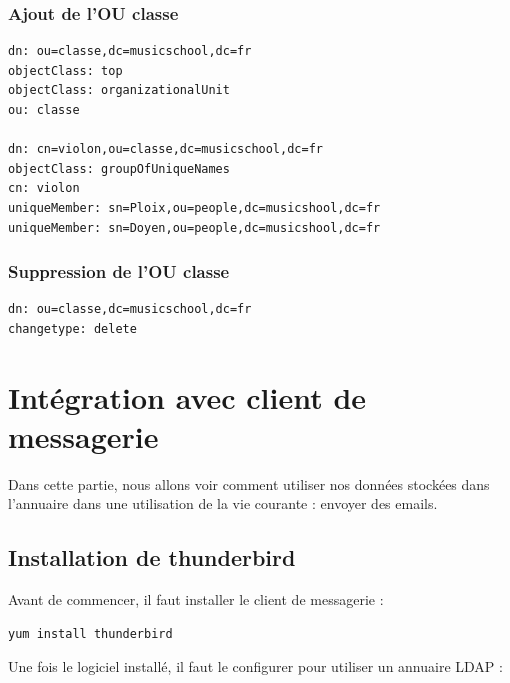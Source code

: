 \documentclass[12pt,a4paper,notitlepage]{article}
\begin{document}
\subsubsection{Ajout de l'OU classe}

\begin{lstlisting}[title=classe.ldif]
dn: ou=classe,dc=musicschool,dc=fr
objectClass: top
objectClass: organizationalUnit
ou: classe

dn: cn=violon,ou=classe,dc=musicschool,dc=fr
objectClass: groupOfUniqueNames
cn: violon
uniqueMember: sn=Ploix,ou=people,dc=musicshool,dc=fr
uniqueMember: sn=Doyen,ou=people,dc=musicshool,dc=fr
\end{lstlisting}

\subsubsection{Suppression de l'OU classe}

\begin{lstlisting}[title=delete-classe.ldif]
dn: ou=classe,dc=musicschool,dc=fr
changetype: delete
\end{lstlisting}


\clearpage
\section{Intégration avec client de messagerie}

Dans cette partie, nous allons voir comment utiliser nos données stockées dans l'annuaire dans une utilisation de la vie courante : envoyer des emails.
\subsection{Installation de thunderbird}

Avant de commencer, il faut installer le client de messagerie :
\begin{verbatim}
yum install thunderbird
\end{verbatim}

\bigskip

Une fois le logiciel installé, il faut le configurer pour utiliser un annuaire LDAP :
\end{document}
